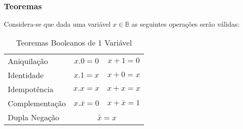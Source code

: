 \documentclass{article}
\begin{document}
            \subsubsection{Teoremas}
            \begin{theorem}
                Considera-se que dada uma variável $x\in\mathbb{B}$ as seguintes operações serão válidas:
                    \begin{table}[H]
                        \centering  
                        \begin{tabular}[]{lcc}\hline
                            Aniquilação    & $x.0=0$ & $x+1=0$\\
                            Identidade     & $x.1=x$ & $x+0=x$\\
                            Idempotência   & $x.x=x$ & $x+x=x$\\
                            Complementação & $x.\bar{x}=0$ & $x+\bar{x}=1$\\\hline
                            Dupla Negação  & \multicolumn{2}{c}{$\bar{\bar{x}}=x$}\\\hline
                        \end{tabular}
                        \caption{Teoremas Booleanos de 1 Variável}
                    \end{table}
            \end{theorem}
\end{document}
